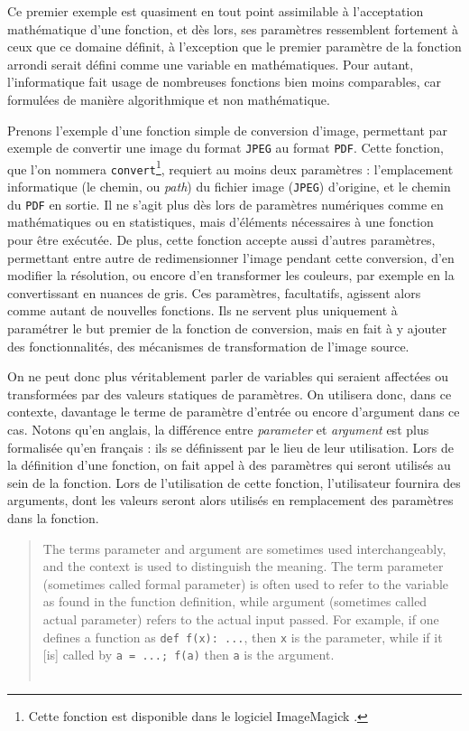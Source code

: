 Ce premier exemple est quasiment en tout point assimilable à l'acceptation mathématique d'une fonction, et dès lors, ses paramètres ressemblent fortement à ceux que ce domaine définit, à l'exception que le premier paramètre de la fonction arrondi serait défini comme une variable en mathématiques.
Pour autant, l'informatique fait usage de nombreuses fonctions bien moins comparables, car formulées de manière algorithmique et non mathématique.

Prenons l'exemple d'une fonction simple de conversion d'image, permettant par exemple de convertir une image du format \texttt{JPEG} au format \texttt{PDF}.
Cette fonction, que l'on nommera \texttt{convert}\footnote{Cette fonction est disponible dans le logiciel ImageMagick \autocite{imagemagick2008imagemagick}.}, requiert au moins deux \og paramètres\fg{} :
	l'emplacement informatique (le \og chemin\fg{}, ou \textit{path}) du fichier image (\texttt{JPEG}) d'origine, et le chemin du \texttt{PDF} en sortie.
Il ne s'agit plus dès lors de paramètres numériques comme en mathématiques ou en statistiques, mais d'éléments nécessaires à une fonction pour être exécutée.
De plus, cette fonction accepte aussi d'autres \og paramètres\fg{}, permettant entre autre de redimensionner l'image pendant cette conversion, d'en modifier la résolution, ou encore d'en transformer les couleurs, par exemple en la convertissant en nuances de gris.
Ces paramètres, facultatifs, agissent alors comme autant de nouvelles fonctions.
Ils ne servent plus uniquement à \og paramétrer\fg{} le but premier de la fonction de conversion, mais en fait à y ajouter des fonctionnalités, des mécanismes de transformation de l'image source.

On ne peut donc plus véritablement parler de variables qui seraient affectées ou transformées par des valeurs statiques de paramètres.
On utilisera donc, dans ce contexte, davantage le terme de paramètre d'entrée ou encore d'argument dans ce cas.
Notons qu'en anglais, la différence entre \textit{parameter} et \textit{argument} est plus formalisée qu'en français : ils se définissent par le lieu de leur utilisation.
Lors de la définition d'une fonction, on fait appel à des paramètres qui seront utilisés au sein de la fonction.
Lors de l'utilisation de cette fonction, l'utilisateur fournira des arguments, dont les valeurs seront alors utilisés en remplacement des paramètres dans la fonction.

\begin{quotation}
	\noindent \og The terms parameter and argument are sometimes used interchangeably, and the context is used to distinguish the meaning. The term parameter (sometimes called formal parameter) is often used to refer to the variable as found in the function definition, while argument (sometimes called actual parameter) refers to the actual input passed. For example, if one defines a function as \texttt{def f(x): ...}, then \texttt{x} is the parameter, while if it [is] called by \texttt{a = ...; f(a)} then \texttt{a} is the argument.\fg{}\\
	\mbox{}~ \hfill \autocite{wiki_parameter2017} 
\end{quotation}


